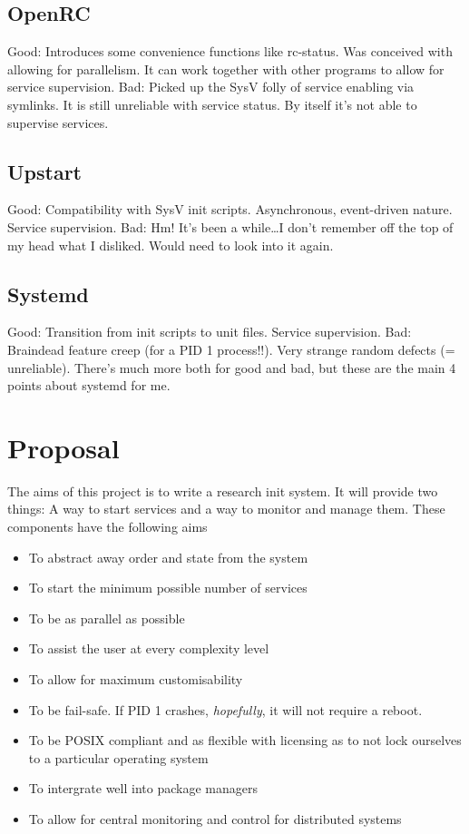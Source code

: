 \documentclass{article}
\begin{document}
\subsection{OpenRC}
Good: Introduces some convenience functions like rc-status. Was conceived with allowing
for parallelism. It can work together with other programs to allow for service supervision.
Bad: Picked up the SysV folly of service enabling via symlinks. It is still unreliable with
service status. By itself it's not able to supervise services.

\subsection{Upstart}
Good: Compatibility with SysV init scripts. Asynchronous, event-driven nature. Service
supervision. Bad: Hm! It's been a while\dots I don't remember off the top of my head what I
disliked. Would need to look into it again.

\subsection{Systemd}
Good: Transition from init scripts to unit files. Service supervision. Bad: Braindead
feature creep (for a PID 1 process!!). Very strange random defects (= unreliable). There's
much more both for good and bad, but these are the main 4 points about systemd for me.

\section{Proposal}
The aims of this project is to write a research init system. It will provide
two things: A way to start services and a way to monitor and manage them.
These components have the following aims
\begin{itemize}
    \item To abstract away order and state from the system
    \item To start the minimum possible number of services
    \item To be as parallel as possible
    \item To assist the user at every complexity level
    \item To allow for maximum customisability
    \item To be fail-safe. If PID 1 crashes, \textit{hopefully}, it will not require a reboot.
    \item To be POSIX compliant and as flexible with licensing as to not lock ourselves to a particular operating system
    \item To intergrate well into package managers
    \item To allow for central monitoring and control for distributed systems
\end{itemize}
\end{document}
